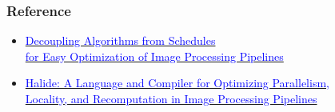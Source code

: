 \documentclass[hyperref]{beamer}
\begin{document}
\begin{frame}
  \frametitle{Reference}
  \begin{itemize}
  \item \href{http://people.csail.mit.edu/jrk/halide12}{\textcolor{blue}{Decoupling Algorithms from Schedules\\
    for Easy Optimization of Image Processing Pipelines}}
  \item \href{http://people.csail.mit.edu/jrk/halide-pldi13.pdf}{\textcolor{blue}{Halide: A Language and Compiler for Optimizing Parallelism,\\
    Locality, and Recomputation in Image Processing Pipelines}}
  \end{itemize}
\end{frame}



\end{document}
